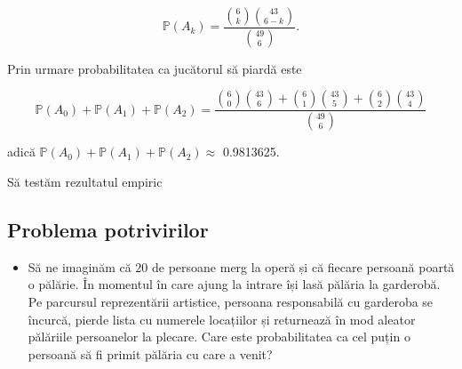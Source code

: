 \documentclass[]{article}
\newenvironment{Shaded}{\begin{snugshade}}{\end{snugshade}}
\newcommand{\CommentTok}[1]{\textcolor[rgb]{0.56,0.35,0.01}{\textit{#1}}}
\newcommand{\DecValTok}[1]{\textcolor[rgb]{0.00,0.00,0.81}{#1}}
\newcommand{\FloatTok}[1]{\textcolor[rgb]{0.00,0.00,0.81}{#1}}
\newcommand{\KeywordTok}[1]{\textcolor[rgb]{0.13,0.29,0.53}{\textbf{#1}}}
\newcommand{\NormalTok}[1]{#1}
\newcommand{\OperatorTok}[1]{\textcolor[rgb]{0.81,0.36,0.00}{\textbf{#1}}}
\newcommand{\StringTok}[1]{\textcolor[rgb]{0.31,0.60,0.02}{#1}}
\newenvironment{frshaded*}{%
  \def\FrameCommand{\fboxrule=\FrameRule\fboxsep=\FrameSep \fcolorbox{framecolor}{shadecolor1}}%
  \MakeFramed {\advance\hsize-\width \FrameRestore}}%
{\endMakeFramed}
\newenvironment{rmdblock}[1]
  {\begin{frshaded*}
  \begin{itemize}
  \renewcommand{\labelitemi}{
    \raisebox{-.7\height}[0pt][0pt]{
      {\setkeys{Gin}{width=2em,keepaspectratio}\texttt{[image: images/icons/\#1]}}
    }
  }
  \item
  }
  {
  \end{itemize}
  \end{frshaded*}
  }
\newenvironment{rmdexercise}
  {\begin{rmdblock}{exercise}}
  {\end{rmdblock}}
\begin{document}
\[
  \mathbb{P}(A_k) = \frac{\binom{6}{k}\binom{43}{6-k}}{\binom{49}{6}}.
\]

Prin urmare probabilitatea ca jucătorul să piardă este

\[
  \mathbb{P}(A_0) + \mathbb{P}(A_1) + \mathbb{P}(A_2) = \frac{\binom{6}{0}\binom{43}{6} + \binom{6}{1}\binom{43}{5} +\binom{6}{2}\binom{43}{4}}{\binom{49}{6}}
\]

adică \(\mathbb{P}(A_0) + \mathbb{P}(A_1) + \mathbb{P}(A_2)\approx\)
0.9813625.

Să testăm rezultatul empiric

\begin{Shaded}
\end{Shaded}

\hypertarget{problema-potrivirilor}{%
\subsection{Problema potrivirilor}\label{problema-potrivirilor}}

\begin{rmdexercise}
Să ne imaginăm că \(20\) de persoane merg la operă și că fiecare
persoană poartă o pălărie. În momentul în care ajung la intrare își lasă
pălăria la garderobă. Pe parcursul reprezentării artistice, persoana
responsabilă cu garderoba se încurcă, pierde lista cu numerele
locațiilor și returnează în mod aleator pălăriile persoanelor la
plecare. Care este probabilitatea ca cel puțin o persoană să fi primit
pălăria cu care a venit?
\end{rmdexercise}
\end{document}
